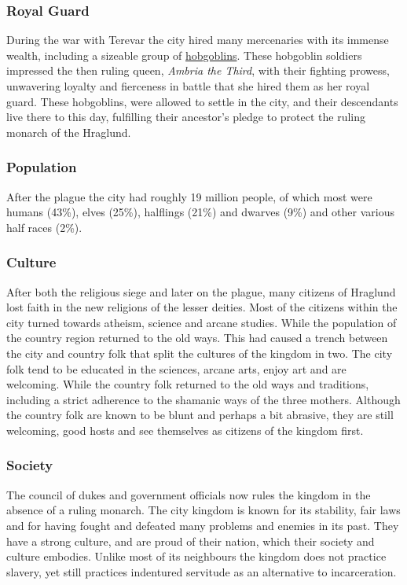 \subsubsection{Royal Guard}

During the war with Terevar the city hired many mercenaries with its immense
wealth, including a sizeable group of \hyperref[sec:Hobgoblins]{hobgoblins}.
These hobgoblin soldiers impressed the then ruling queen, \emph{Ambria the
  Third}, with their fighting prowess, unwavering loyalty and fierceness in
battle that she hired them as her royal guard. These hobgoblins, were allowed
to settle in the city, and their descendants live there to this day,
fulfilling their ancestor's pledge to protect the ruling monarch of the
Hraglund.

\subsubsection{Population}

After the plague the city had roughly 19 million people, of which most were
humans (43\%), elves (25\%), halflings (21\%) and dwarves (9\%) and other
various half races (2\%).

\subsubsection{Culture}

After both the religious siege and later on the plague, many citizens of
Hraglund lost faith in the new religions of the lesser deities. Most of
the citizens within the city turned towards atheism, science and arcane
studies. While the population of the country region returned to the old
ways. This had caused a trench between the city and country folk that split
the cultures of the kingdom in two. The city folk tend to be educated in
the sciences, arcane arts, enjoy art and are welcoming. While the country folk
returned to the old ways and traditions, including a strict adherence to the
shamanic ways of the three mothers. Although the country folk are known to be
blunt and perhaps a bit abrasive, they are still welcoming, good hosts and see
themselves as citizens of the kingdom first.

\subsubsection{Society}

The council of dukes and government officials now rules the kingdom in the
absence of a ruling monarch. The city kingdom is known for its stability,
fair laws and for having fought and defeated many problems and enemies in
its past. They have a strong culture, and are proud of their nation, which
their society and culture embodies. Unlike most of its neighbours the kingdom
does not practice slavery, yet still practices indentured servitude as an
alternative to incarceration.

